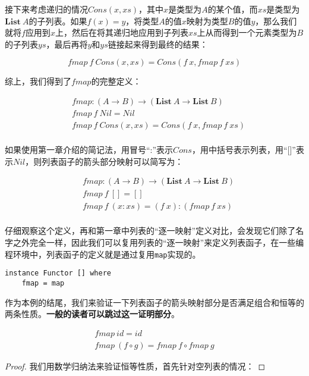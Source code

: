 \documentclass{article}
\begin{document}
\begin{example}
接下来考虑递归的情况$Cons(x, xs)$，其中$x$是类型为$A$的某个值，而$xs$是类型为$\mathbf{List}\ A$的子列表。如果$f(x) = y$，将类型$A$的值$x$映射为类型$B$的值$y$，那么我们就将$f$应用到$x$上，然后在将其递归地应用到子列表$xs$上从而得到一个元素类型为$B$的子列表$ys$，最后再将$y$和$ys$链接起来得到最终的结果：

\[
fmap\ f\ Cons(x, xs) = Cons(f\ x, fmap\ f\ xs)
\]

综上，我们得到了$fmap$的完整定义：

\[
\begin{array}{l}
\quad    fmap : (A \to B) \to (\mathbf{List}\ A \to \mathbf{List}\ B) \\
\quad    fmap\ f\ Nil = Nil \\
\quad    fmap\ f\ Cons(x, xs) = Cons(f\ x, fmap\ f\ xs) \\
\end{array}
\]

如果使用第一章介绍的简记法，用冒号“:”表示$Cons$，用中括号表示列表，用“[]”表示$Nil$，则列表函子的箭头部分映射可以简写为：

\[
\begin{array}{l}
\quad    fmap : (A \to B) \to (\mathbf{List}\ A \to \mathbf{List}\ B) \\
\quad    fmap\ f\ [] = [] \\
\quad    fmap\ f\ (x:xs) = (f\ x):(fmap\ f\ xs) \\
\end{array}
\]

仔细观察这个定义，再和第一章中列表的“逐一映射”定义对比，会发现它们除了名字之外完全一样，因此我们可以复用列表的“逐一映射”来定义列表函子，在一些编程环境中，列表函子的定义就是通过复用\texttt{map}实现的。

\lstset{frame=single}
\begin{lstlisting}
instance Functor [] where
    fmap = map
\end{lstlisting}

作为本例的结尾，我们来验证一下列表函子的箭头映射部分是否满足组合和恒等的两条性质。\textbf{一般的读者可以跳过这一证明部分}。

\begin{mdframed}
\[
\begin{array}{l}
fmap\ id = id \\
fmap\ (f \circ g) = fmap\ f \circ fmap\ g
\end{array}
\]

\begin{proof}
我们用数学归纳法来验证恒等性质，首先针对空列表的情况：


\end{proof}
\end{mdframed}
\end{example}
\end{document}
